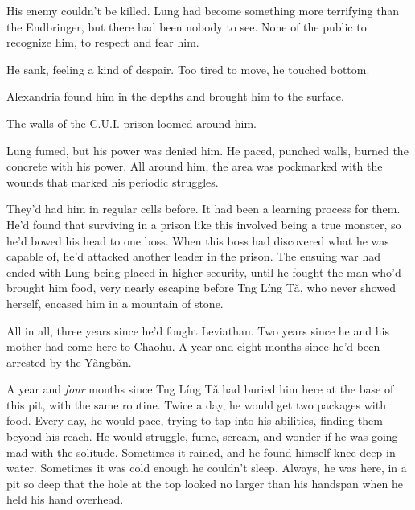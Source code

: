 His enemy couldn't be killed.  Lung had become something more terrifying than the Endbringer, but there had been nobody to see.  None of the public to recognize him, to respect and fear him.



He sank, feeling a kind of despair.  Too tired to move, he touched bottom.



Alexandria found him in the depths and brought him to the surface.



\sectionbreak






The walls of the C.U.I. prison loomed around him.



Lung fumed, but his power was denied him.  He paced, punched walls, burned the concrete with his power.  All around him, the area was pockmarked with the wounds that marked his periodic struggles.



They'd had him in regular cells before.  It had been a learning process for them.  He'd found that surviving in a prison like this involved being a true monster, so he'd bowed his head to one boss.  When this boss had discovered what he was capable of, he'd attacked another leader in the prison.  The ensuing war had ended with Lung being placed in higher security, until he fought the man who'd brought him food, very nearly escaping before Tng L\'{i}ng T\v{a}, who never showed herself, encased him in a mountain of stone.



All in all, three years since he'd fought Leviathan.  Two years since he and his mother had come here to Chaohu.  A year and eight months since he'd been arrested by the Y\`{a}ngb\v{a}n.



A year and \emph{four }months since Tng L\'{i}ng T\v{a} had buried him here at the base of this pit, with the same routine.  Twice a day, he would get two packages with food.  Every day, he would pace, trying to tap into his abilities, finding them beyond his reach.  He would struggle, fume, scream, and wonder if he was going mad with the solitude.  Sometimes it rained, and he found himself knee deep in water.  Sometimes it was cold enough he couldn't sleep.  Always, he was here, in a pit so deep that the hole at the top looked no larger than his handspan when he held his hand overhead.



